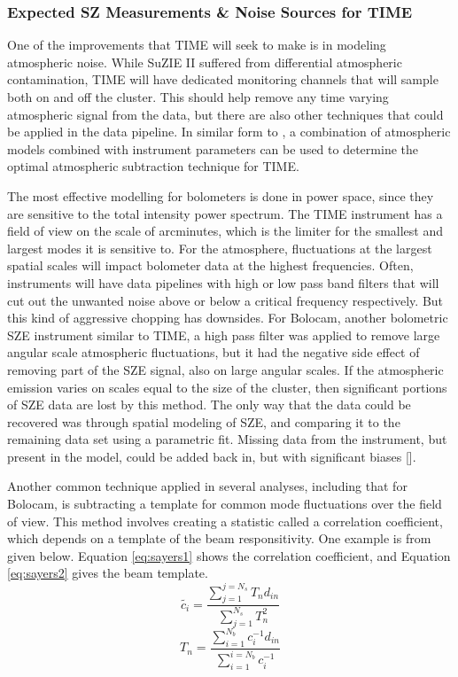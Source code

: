 \documentclass[manuscript]{aastex}
\begin{document}
\subsubsection{Expected SZ Measurements \& Noise Sources for TIME}

One of the improvements that TIME will seek to make is in modeling atmospheric noise. While SuZIE II suffered from differential atmospheric contamination, TIME will have dedicated monitoring channels that will sample both on and off the cluster. This should help remove any time varying atmospheric signal from the data, but there are also other techniques that could be applied in the data pipeline. In similar form to \cite{Sayers2010}, a combination of atmospheric models combined with instrument parameters can be used to determine the optimal atmospheric subtraction technique for TIME. 

The most effective modelling for bolometers is done in power space, since they are sensitive to the total intensity power spectrum. The TIME instrument has a field of view on the scale of arcminutes, which is the limiter for the smallest and largest modes it is sensitive to. For the atmosphere, fluctuations at the largest spatial scales will impact bolometer data at the highest frequencies. Often, instruments will have data pipelines with high or low pass band filters that will cut out the unwanted noise above or below a critical frequency respectively. But this kind of aggressive chopping has downsides. For Bolocam, another bolometric SZE instrument similar to TIME, a high pass filter was applied to remove large angular scale atmospheric fluctuations, but it had the negative side effect of removing part of the SZE signal, also on large angular scales. If the atmospheric emission varies on scales equal to the size of the cluster, then significant portions of SZE data are lost by this method. The only way that the data could be recovered was through spatial modeling of SZE, and comparing it to the remaining data set using a parametric fit. Missing data from the instrument, but present in the model, could be added back in, but with significant biases [\cite{Sayers2013}].

Another common technique applied in several analyses, including that for Bolocam, is subtracting a template for common mode fluctuations over the field of view. This method involves creating a statistic called a correlation coefficient, which depends on a template of the beam responsitivity. One example is from \cite{Sayers2010} given below. Equation \ref{eq:sayers1} shows the correlation coefficient, and Equation \ref{eq:sayers2} gives the beam template.
\begin{equation}\label{eq:sayers1}
    \tilde{c_{i}} = \frac{\sum_{j=1}^{j=N_{s}} T_{n}d_{in}}{\sum_{j=1}^{N_{s}} T_{n}^{2}}
\end{equation}
\begin{equation}\label{eq:sayers2}
    T_{n} = \frac{\sum_{i=1}^{N_{b}} c_{i}^{-1} d_{in}}{\sum_{i=1}^{i=N_{b}} c_{i}^{-1}}
\end{equation}
\end{document}
